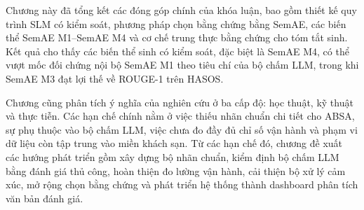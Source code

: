 Chương này đã tổng kết các đóng góp chính của khóa luận, bao gồm thiết kế quy trình SLM có kiểm soát, phương pháp chọn bằng chứng bằng SemAE, các biến thể SemAE M1--SemAE M4 và cơ chế trung thực bằng chứng cho tóm tắt sinh. Kết quả cho thấy các biến thể sinh có kiểm soát, đặc biệt là SemAE M4, có thể vượt mốc đối chứng nội bộ SemAE M1 theo tiêu chí của bộ chấm LLM, trong khi SemAE M3 đạt lợi thế về ROUGE-1 trên HASOS.

Chương cũng phân tích ý nghĩa của nghiên cứu ở ba cấp độ: học thuật, kỹ thuật và thực tiễn. Các hạn chế chính nằm ở việc thiếu nhãn chuẩn chi tiết cho ABSA, sự phụ thuộc vào bộ chấm LLM, việc chưa đo đầy đủ chỉ số vận hành và phạm vi dữ liệu còn tập trung vào miền khách sạn. Từ các hạn chế đó, chương đề xuất các hướng phát triển gồm xây dựng bộ nhãn chuẩn, kiểm định bộ chấm LLM bằng đánh giá thủ công, hoàn thiện đo lường vận hành, cải thiện bộ xử lý cảm xúc, mở rộng chọn bằng chứng và phát triển hệ thống thành dashboard phân tích văn bản đánh giá.
